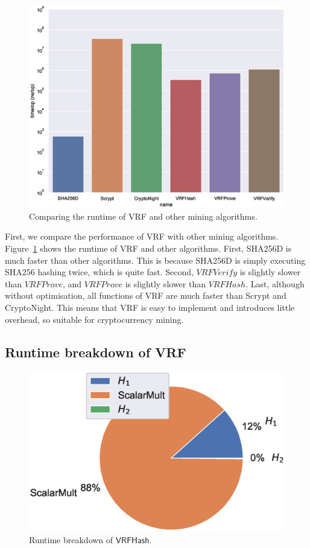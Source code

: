 \begin{figure}[htp]
    \centering
    \includegraphics[width=.7\linewidth]{figs/runtime-comparison.eps}
    \caption{Comparing the runtime of VRF and other mining algorithms.}
    \label{fig:runtime-comparison}
\end{figure}

First, we compare the performance of VRF with other mining algorithms.
Figure~\ref{fig:runtime-comparison} shows the runtime of VRF and other algorithms.
First, SHA256D is much faster than other algorithms.
This is because SHA256D is simply executing SHA256 hashing twice, which is quite fast.
Second, $VRFVerify$ is slightly slower than $VRFProve$, and $VRFProve$ is slightly slower than $VRFHash$.
Last, although without optimisation, all functions of VRF are much faster than Scrypt and CryptoNight.
This means that VRF is easy to implement and introduces little overhead, so suitable for cryptocurrency mining.



\subsection{Runtime breakdown of VRF}

\begin{figure}[htp]
    \centering
    \includegraphics[width=.7\linewidth]{figs/runtime-breakdown.eps}
    \caption{Runtime breakdown of $\mathsf{VRFHash}$.}
    \label{fig:runtime-breakdown}
\end{figure}

